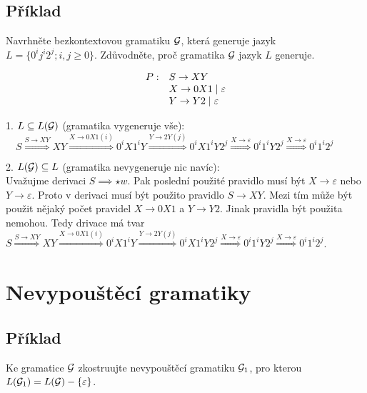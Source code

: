 \subsection{Příklad} 
\noindent
Navrhněte bezkontextovou gramatiku $\mathcal{G}$, která generuje jazyk $L = \{0^ij^i2^j; i, j \geq 0\}$. Zdůvodněte, 
proč gramatika $\mathcal{G}$ jazyk $L$ generuje. 

\[
    \begin{array}{l l}
        P: & S \rightarrow XY  \\
        & X \rightarrow 0X1 \mid \varepsilon  \\ 
        & Y \rightarrow Y2 \mid \varepsilon \\
    \end{array}
\]
\vspace*{3mm}

1. $L \subseteq L(\mathcal{G})$ (gramatika vygeneruje vše): \\

$\quad S \stackrel{S \rightarrow XY}{\Longrightarrow} XY \stackrel{X \rightarrow 0X1 (i)}{\Longrightarrow} 0^iX1^iY 
\stackrel{Y \rightarrow 2Y(j)}{\Longrightarrow} 0^iX1^iY2^j \stackrel{X \rightarrow \varepsilon}{\Longrightarrow} 
0^i1^iY2^j\stackrel{X \rightarrow \varepsilon}{\Longrightarrow} 0^i1^i2^j $

\vspace*{3mm}
2. $L(\mathcal{G}) \subseteq L$ (gramatika nevygeneruje nic navíc): \\

\noindent
Uvažujme derivaci $S \implies \star w$. Pak poslední použité pravidlo musí být $X \rightarrow \varepsilon$ nebo 
$Y \rightarrow \varepsilon$. Proto v derivaci musí být použito pravidlo $S \rightarrow XY$. Mezi tím může být použit 
nějaký počet pravidel $X \rightarrow 0X1$ a $Y \rightarrow Y2$. Jinak pravidla být použita nemohou. Tedy drivace má tvar 
$ S \stackrel{S \rightarrow XY}{\Longrightarrow} XY \stackrel{X \rightarrow 0X1 (i)}{\Longrightarrow} 0^iX1^iY 
\stackrel{Y \rightarrow 2Y(j)}{\Longrightarrow} 0^iX1^iY2^j \stackrel{X \rightarrow \varepsilon}{\Longrightarrow} 
0^i1^iY2^j\stackrel{X \rightarrow \varepsilon}{\Longrightarrow} 0^i1^i2^j $.

\section*{Nevypouštěcí gramatiky}

\subsection{Příklad}
\noindent
Ke gramatice $\mathcal{G}$ zkostruujte nevypouštěcí gramatiku $\mathcal{G}_1$, pro kterou $L(\mathcal{G}_1) = L(\mathcal{G}) - \{\varepsilon\}$.

